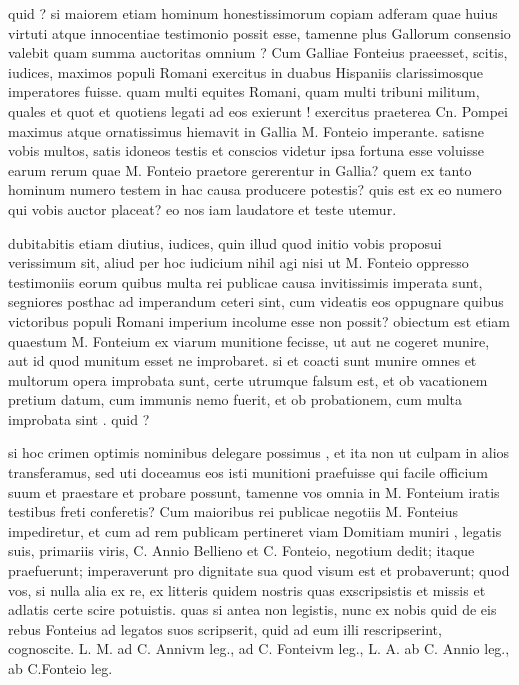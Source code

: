  quid ? si maiorem etiam hominum honestissimorum copiam adferam quae huius virtuti atque innocentiae testimonio possit esse, tamenne plus Gallorum consensio valebit quam summa auctoritas omnium ? Cum Galliae Fonteius praeesset, scitis, iudices, maximos populi Romani exercitus in duabus Hispaniis clarissimosque imperatores fuisse. quam multi equites Romani, quam multi tribuni militum, quales et quot et quotiens legati ad eos exierunt ! exercitus praeterea Cn. Pompei maximus atque ornatissimus hiemavit in Gallia M. Fonteio imperante. satisne vobis multos, satis idoneos testis et conscios videtur ipsa fortuna esse voluisse earum rerum quae M. Fonteio praetore gererentur in Gallia? quem ex tanto hominum numero testem in hac causa producere potestis? quis est ex eo numero qui vobis auctor placeat? eo nos iam laudatore et teste utemur.

 dubitabitis etiam diutius, iudices, quin illud quod initio vobis proposui verissimum sit, aliud per hoc iudicium nihil agi nisi ut M. Fonteio oppresso testimoniis eorum quibus multa rei publicae causa invitissimis imperata sunt, segniores posthac ad imperandum ceteri sint, cum videatis eos oppugnare quibus victoribus populi Romani imperium incolume esse non possit? obiectum est etiam quaestum M. Fonteium ex viarum munitione fecisse, ut aut ne cogeret munire, aut id quod munitum esset ne improbaret. si et coacti sunt munire omnes et multorum opera improbata sunt, certe utrumque falsum est, et ob vacationem pretium datum, cum immunis nemo fuerit, et ob probationem, cum multa improbata sint . quid ?

 si hoc crimen optimis nominibus delegare possimus , et ita non ut culpam in alios transferamus, sed uti doceamus eos isti munitioni praefuisse qui facile officium suum et praestare et probare possunt, tamenne vos omnia in M. Fonteium iratis testibus freti conferetis? Cum maioribus rei publicae negotiis M. Fonteius impediretur, et cum ad rem publicam pertineret viam Domitiam muniri , legatis suis, primariis viris, C. Annio Bellieno et C. Fonteio, negotium dedit; itaque praefuerunt; imperaverunt pro dignitate sua quod visum est et probaverunt; quod vos, si nulla alia ex re, ex litteris quidem nostris quas exscripsistis et missis et adlatis certe scire potuistis. quas si antea non legistis, nunc ex nobis quid de eis rebus Fonteius ad legatos suos scripserit, quid ad eum illi rescripserint, cognoscite. L. M. ad C. Annivm leg., ad C. Fonteivm leg., L. A. ab C. Annio leg., ab C.Fonteio leg.

